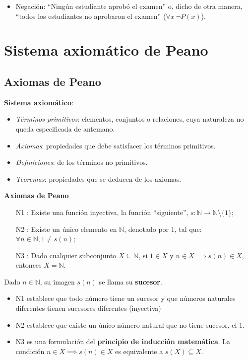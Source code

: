 \begin{enumerate}[label=\roman*)]
\begin{fmd-example}
\begin{itemize}
		\item Negación: ``Ningún estudiante aprobó el examen'' o, dicho de otra manera, ``todos los estudiantes no aprobaron el examen'' ($\forall x \ \neg P(x)$).
		\end{itemize}
	\end{fmd-example}
\end{enumerate}


\section{Sistema axiomático de Peano} 

\subsection{Axiomas de Peano} \label{sec:peano} 
\textbf{Sistema axiomático}:

\begin{itemize}
	\item \textit{Términos primitivos}: elementos, conjuntos o relaciones, cuya naturaleza no queda especificada de antemano.
	\item \textit{Axiomas}: propiedades que debe satisfacer los términos primitivos.
	\item \textit{Definiciones}: de los términos no primitivos.
	\item \textit{Teoremas}: propiedades que se deducen de los axiomas.
\end{itemize}

\textbf{Axiomas de Peano}
\begin{itemize}
	\item[N1]: Existe una función inyectiva, la función ``siguiente'', $s: \mathbb{N} \rightarrow \mathbb{N} \setminus \{1\}$;
	\item[N2]: Existe un único elemento en $\mathbb{N}$, denotado por 1, tal que: $\forall n \in \mathbb{N}, 1 \ne s(n)$;
	\item[N3]: Dado cualquier subconjunto $X \subseteq \mathbb{N}$, si $1 \in X$ y $n \in X \implies s(n) \in X$, entonces $X = \mathbb{N}$.
\end{itemize}
Dado $n \in \mathbb{N}$, su imagen $s(n)$ se llama su \textbf{sucesor}.
\begin{itemize}
	\item N1 establece que todo número tiene un sucesor y que números naturales diferentes tienen sucesores diferentes (inyectiva)
	\item N2 establece que existe un único número natural que no tiene sucesor, el 1.
	\item N3 es una formulación del \textbf{principio de inducción matemática}. La condición $n \in X \implies s(n) \in X$ es equivalente a $s(X) \subseteq X$.
\end{itemize}

